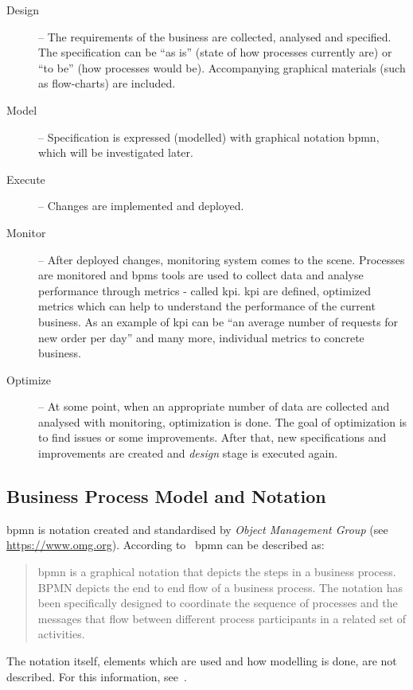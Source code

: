 \begin{description}
	\item[Design] -- The requirements of the business are collected, analysed and specified. The specification can be ``as is'' (state of how processes currently are) or ``to be'' (how processes would be). Accompanying graphical materials (such as flow-charts) are included.
    \item[Model] -- Specification is expressed (modelled) with graphical notation \gls{bpmn}, which will be investigated later.
    \item[Execute] -- Changes are implemented and deployed.
    \item[Monitor] -- After deployed changes, monitoring system comes to the scene. Processes are monitored and \gls{bpms} tools are used to collect data and analyse performance through metrics - called \gls{kpi}. \gls{kpi} are defined, optimized metrics which can help to understand the performance of the current business. As an example of \gls{kpi} can be ``an average number of requests for new order per day'' and many more, individual metrics to concrete business.
    \item[Optimize] -- At some point, when an appropriate number of data are collected and analysed with monitoring, optimization is done. The goal of optimization is to find issues or some improvements. After that, new specifications and improvements are created and \textit{design} stage is executed again.
\end{description}
\subsection{Business Process Model and Notation}
\gls{bpmn} is notation created and standardised by \textit{Object Management Group} (see \url{https://www.omg.org}). According to~\cite{bpmn-org-2018} \gls{bpmn} can be described as:
\begin{quote}
  \gls{bpmn} is a graphical notation that depicts the steps in a business process. BPMN depicts the end to end flow of a business process. The notation has been specifically designed to coordinate the sequence of processes and the messages that flow between different process participants in a related set of activities.
\end{quote}
The notation itself, elements which are used and how modelling is done, are not described. For this information, see~\cite{bpmn-org-2018}.
